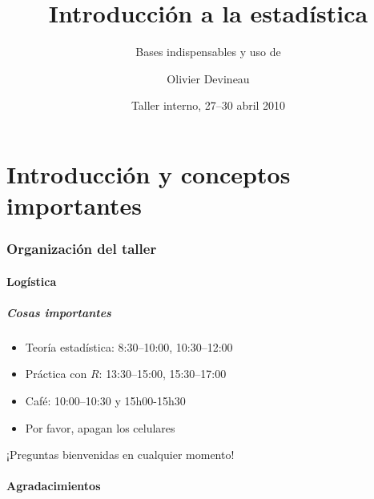 \documentclass[gray,handout,mathserif]{beamer}
\title[Introducci\'on a la estad\'istica]{Introducci\'on a la estad\'istica}
\subtitle[Bases indispensables y uso de R]{Bases indispensables y uso de \Rlogo}
\author[]{Olivier Devineau}
\institute[]{Fundaci\'on Charles Darwin}
\date[]{Taller interno, 27--30 abril 2010}
\begin{document}
\begin{frame}[label=title]
  \titlepage
\end{frame}%





\part[Introducci\'on]{Introducci\'on y conceptos importantes}



  
\section*{Organizaci\'on del taller}

\subsection*{Log\'istica}

\begin{frame}[label=admin]
  \frametitle{Cosas importantes}
  \begin{itemize}
    \item Teor\'ia estad\'istica: {\small 8:30--10:00, 10:30--12:00}
    \item Pr\'actica con $R$: {\small 13:30--15:00, 15:30--17:00}
    \item Caf\'e: {\small 10:00--10:30 y 15h00-15h30}
    \item Por favor, apagan los celulares
  \end{itemize}
  \begin{block}{}
    \begin{center}
      ¡Preguntas bienvenidas en cualquier momento!
    \end{center}
  \end{block}
\end{frame}%


\subsection*{Agradacimientos}
\end{document}
